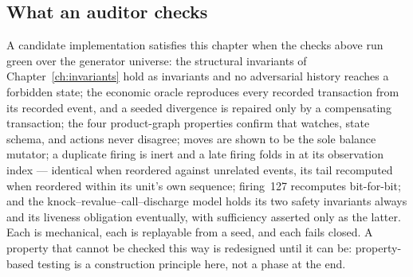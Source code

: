 \subsection{What an auditor checks}

A candidate implementation satisfies this chapter when the checks above run green over the
generator universe: the structural invariants of Chapter~\ref{ch:invariants} hold as
invariants and no adversarial history reaches a forbidden state; the economic oracle
reproduces every recorded transaction from its recorded event, and a seeded divergence is
repaired only by a compensating transaction; the four product-graph properties confirm that
watches, state schema, and actions never disagree; moves are shown to be the sole balance
mutator; a duplicate firing is inert and a late firing folds in at its observation index ---
identical when reordered against unrelated events, its tail recomputed when reordered within
its unit's own sequence; firing~127 recomputes bit-for-bit; and the
knock--revalue--call--discharge model holds its two safety invariants
always and its liveness obligation eventually, with sufficiency asserted only as the latter.
Each is mechanical, each is replayable from a seed, and each fails closed. A property that
cannot be checked this way is redesigned until it can be: property-based testing is a
construction principle here, not a phase at the end.

